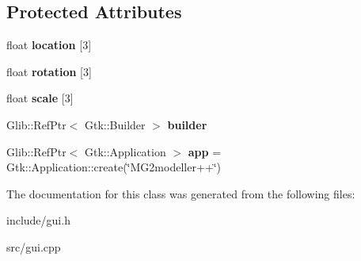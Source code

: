 \subsection*{Protected Attributes}
\begin{DoxyCompactItemize}
\item 
\mbox{\label{classgui_a90ebd6966fcffb39facd354ad9c9a16b}} 
float {\bfseries location} \mbox{[}3\mbox{]}
\item 
\mbox{\label{classgui_aa61d2bc7fd54ebb5b470a55c343bb36f}} 
float {\bfseries rotation} \mbox{[}3\mbox{]}
\item 
\mbox{\label{classgui_a718fac860741e34b56ae2a72e6df6247}} 
float {\bfseries scale} \mbox{[}3\mbox{]}
\item 
\mbox{\label{classgui_a353888f26390a86d177ab6f91e7c6b7c}} 
Glib\+::\+Ref\+Ptr$<$ Gtk\+::\+Builder $>$ {\bfseries builder}
\item 
\mbox{\label{classgui_accb3e611ba2ebd4b4747ade98473e9ba}} 
Glib\+::\+Ref\+Ptr$<$ Gtk\+::\+Application $>$ {\bfseries app} = Gtk\+::\+Application\+::create(\char`\"{}M\+G2modeller++\char`\"{})
\end{DoxyCompactItemize}


The documentation for this class was generated from the following files\+:\begin{DoxyCompactItemize}
\item 
include/gui.\+h\item 
src/gui.\+cpp\end{DoxyCompactItemize}
